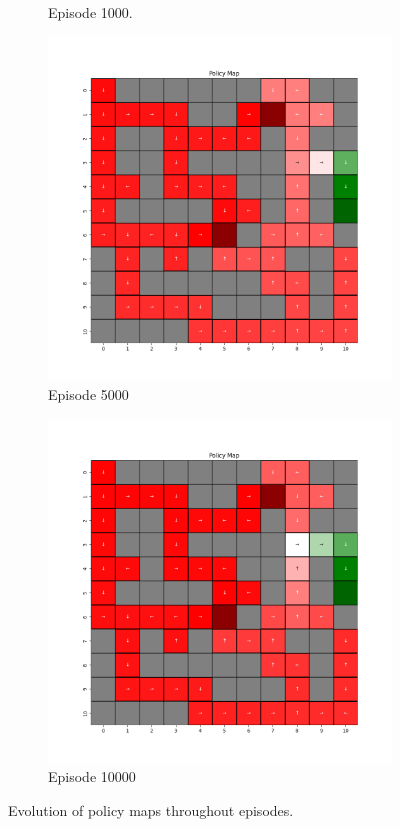 \documentclass{assignment}
\begin{document}
\begin{figure}[H]
\begin{subfigure}{0.3\textwidth}
    \caption{Episode 1000.}
    \end{subfigure}\hfill
    \begin{subfigure}{0.3\textwidth}
        \includegraphics[width=\textwidth]{figures/policy_q/alpha_sweep/policy_alpha_0.001_gamma_0.95_epsilon_0.2_iteration_5000.png}
    \caption{Episode 5000}
    \end{subfigure}\hfill
    \begin{subfigure}{0.3\textwidth}
        \includegraphics[width=\textwidth]{figures/policy_q/alpha_sweep/policy_alpha_0.001_gamma_0.95_epsilon_0.2_iteration_10000.png}
    \caption{Episode 10000}
    \end{subfigure}
    \caption{Evolution of policy maps throughout episodes.}
    \label{fig:alpha_0.001_q_learning_policy}
\end{figure}
\end{document}

